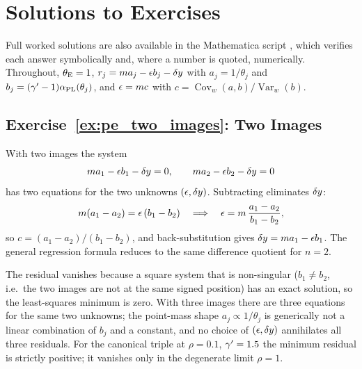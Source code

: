 
\section{Solutions to Exercises}
\label{sec:pe_solutions}

\noindent
Full worked solutions are also available in the Mathematica script
,
which verifies each answer symbolically and, where a number is quoted,
numerically. Throughout, $\theta_{\mathrm{E}}=1$, $r_j=m a_j-\epsilon b_j-\delta y$
with $a_j=1/\theta_j$ and $b_j=(\gamma'-1)\alpha_{\rm PL}(\theta_j)$, and
$\epsilon=m c$ with $c=\operatorname{Cov}_w(a,b)/\operatorname{Var}_w(b)$.

\subsection*{Exercise~\ref{ex:pe_two_images}: Two Images}

With two images the system
\[
  m a_1-\epsilon b_1-\delta y=0,\qquad
  m a_2-\epsilon b_2-\delta y=0
\]
has two equations for the two unknowns $(\epsilon,\delta y)$.
Subtracting eliminates $\delta y$:
\[
  m(a_1-a_2)=\epsilon\,(b_1-b_2)
  \quad\Longrightarrow\quad
  \epsilon=m\,\frac{a_1-a_2}{b_1-b_2},
\]
so $c=(a_1-a_2)/(b_1-b_2)$, and back-substitution gives
$\delta y=m a_1-\epsilon b_1$. The general regression formula
reduces to the same difference quotient for $n=2$.

The residual vanishes because a square system that is
non-singular ($b_1\neq b_2$, i.e.\ the two images are not at the same
signed position) has an exact solution, so the least-squares minimum is
zero. With three images there are three equations for the same two
unknowns; the point-mass shape $a_j\propto1/\theta_j$ is generically
not a linear combination of $b_j$ and a constant, and no choice
of $(\epsilon,\delta y)$ annihilates all three residuals. For the
canonical triple at $\rho=0.1$, $\gamma'=1.5$ the minimum residual is
strictly positive; it vanishes only in the degenerate limit $\rho=1$.

